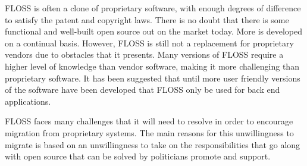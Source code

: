  FLOSS is often a clone of proprietary software, with enough degrees of difference to satisfy the patent and copyright laws. There is no doubt that there is some functional and well-built open source out on the market today. More is developed on a continual basis. However, FLOSS is still not a replacement for proprietary vendors due to obstacles that it presents. Many versions of FLOSS require a higher level of knowledge than vendor software, making it more challenging than proprietary software. It has been suggested that until more user friendly versions of the software have been developed that FLOSS only be used for back end applications.

 FLOSS faces many challenges that it will need to resolve in order to encourage migration from proprietary systems. 
  The main reasons for this unwillingness to migrate is based on an unwillingness to take on the responsibilities that go along with open source that can be solved by politicians promote and support.
  
  
